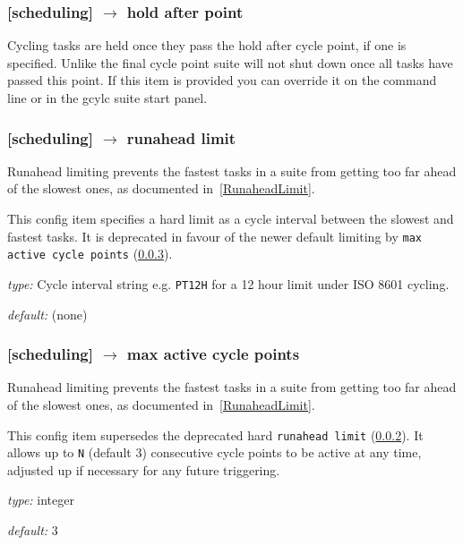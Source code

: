 \subsubsection[hold after point]{[scheduling] $\rightarrow$ hold after point}

Cycling tasks are held once they pass the hold after cycle point, if one is
specified. Unlike the final cycle point suite will not shut down once all tasks
have passed this point. If this item is provided you can override it on the 
command line or in the gcylc suite start panel.

\subsubsection[runahead limit]{[scheduling] $\rightarrow$ runahead limit}
\label{runahead limit}

Runahead limiting prevents the fastest tasks in a suite from getting too far
ahead of the slowest ones, as documented in~\ref{RunaheadLimit}.

This config item specifies a hard limit as a cycle interval between the
slowest and fastest tasks. It is deprecated in favour of the newer default 
limiting by \lstinline=max active cycle points= (\ref{max active cycle points}).

\begin{myitemize}
    \item {\em type:} Cycle interval string e.g. \lstinline=PT12H=
    for a 12 hour limit under ISO 8601 cycling.
    \item {\em default:} (none)
\end{myitemize}

\subsubsection[max active cycle points]{[scheduling] $\rightarrow$
 max active cycle points}
\label{max active cycle points}

Runahead limiting prevents the fastest tasks in a suite from getting too far
ahead of the slowest ones, as documented in~\ref{RunaheadLimit}.

This config item supersedes the deprecated hard \lstinline=runahead limit= 
(\ref{runahead limit}). It allows up to \lstinline=N= (default 3) consecutive
cycle points to be active at any time, adjusted up if necessary for
any future triggering.

\begin{myitemize}
    \item {\em type:} integer
    \item {\em default:} 3
\end{myitemize}


